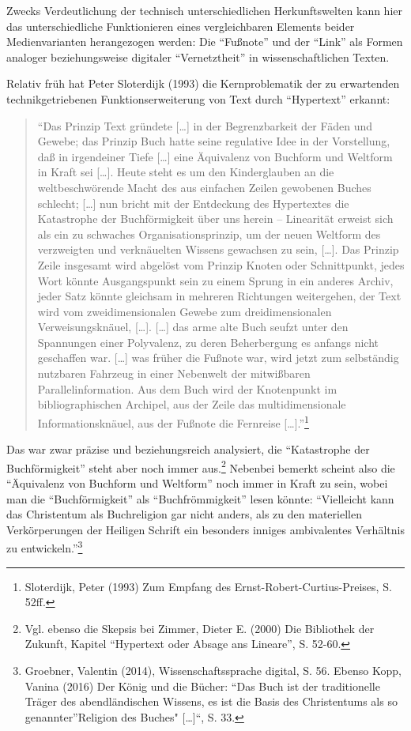 \documentclass[a4paper,
fontsize=11pt,
oneside,
numbers=noperiodatend,
parskip=half-,
bibliography=totoc,
final
]{scrartcl}
\begin{document}
Zwecks Verdeutlichung der technisch unterschiedlichen Herkunftswelten
kann hier das unterschiedliche Funktionieren eines vergleichbaren
Elements beider Medienvarianten herangezogen werden: Die
\enquote{Fußnote} und der \enquote{Link} als Formen analoger
beziehungsweise digitaler \enquote{Vernetztheit} in wissenschaftlichen
Texten.

Relativ früh hat Peter Sloterdijk (1993) die Kernproblematik der zu
erwartenden technikgetriebenen Funktionserweiterung von Text durch
\enquote{Hypertext} erkannt:

\begin{quote}
\enquote{Das Prinzip Text gründete {[}\ldots{}{]} in der Begrenzbarkeit
der Fäden und Gewebe; das Prinzip Buch hatte seine regulative Idee in
der Vorstellung, daß in irgendeiner Tiefe {[}\ldots{}{]} eine Äquivalenz
von Buchform und Weltform in Kraft sei {[}\ldots{}{]}. Heute steht es um
den Kinderglauben an die weltbeschwörende Macht des aus einfachen Zeilen
gewobenen Buches schlecht; {[}\ldots{}{]} nun bricht mit der Entdeckung
des Hypertextes die Katastrophe der Buchförmigkeit über uns herein --
Linearität erweist sich als ein zu schwaches Organisationsprinzip, um
der neuen Weltform des verzweigten und verknäuelten Wissens gewachsen zu
sein, {[}\ldots{}{]}. Das Prinzip Zeile insgesamt wird abgelöst vom
Prinzip Knoten oder Schnittpunkt, jedes Wort könnte Ausgangspunkt sein
zu einem Sprung in ein anderes Archiv, jeder Satz könnte gleichsam in
mehreren Richtungen weitergehen, der Text wird vom zweidimensionalen
Gewebe zum dreidimensionalen Verweisungsknäuel, {[}\ldots{}{]}.
{[}\ldots{}{]} das arme alte Buch seufzt unter den Spannungen einer
Polyvalenz, zu deren Beherbergung es anfangs nicht geschaffen war.
{[}\ldots{}{]} was früher die Fußnote war, wird jetzt zum selbständig
nutzbaren Fahrzeug in einer Nebenwelt der mitwißbaren
Parallelinformation. Aus dem Buch wird der Knotenpunkt im
bibliographischen Archipel, aus der Zeile das multidimensionale
Informationsknäuel, aus der Fußnote die Fernreise
{[}\ldots{}{]}.}\footnote{Sloterdijk, Peter (1993) Zum Empfang des
  Ernst-Robert-Curtius-Preises, S. 52ff.}
\end{quote}

Das war zwar präzise und beziehungsreich analysiert, die
\enquote{Katastrophe der Buchförmigkeit} steht aber noch immer
aus.\footnote{Vgl. ebenso die Skepsis bei Zimmer, Dieter E. (2000) Die
  Bibliothek der Zukunft, Kapitel \enquote{Hypertext oder Absage ans
  Lineare}, S. 52-60.} Nebenbei bemerkt scheint also die
\enquote{Äquivalenz von Buchform und Weltform} noch immer in Kraft zu
sein, wobei man die \enquote{Buchförmigkeit} als
\enquote{Buchfrömmigkeit} lesen könnte: \enquote{Vielleicht kann das
Christentum als Buchreligion gar nicht anders, als zu den materiellen
Verkörperungen der Heiligen Schrift ein besonders inniges ambivalentes
Verhältnis zu entwickeln.}\footnote{Groebner, Valentin (2014),
  Wissenschaftssprache digital, S. 56. Ebenso Kopp, Vanina (2016) Der
  König und die Bücher: \enquote{Das Buch ist der traditionelle Träger
  des abendländischen Wissens, es ist die Basis des Christentums als so
  genannter}Religion des Buches" {[}\ldots{}{]}``, S. 33.}
\end{document}
